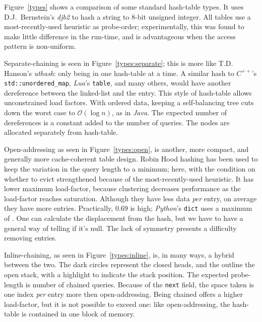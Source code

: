 \documentclass[12pt]{article}
\newcommand{\code}[1]{\colorbox{light-gray}{\texttt{#1}}}
\begin{document}
Figure~\ref{types} shows a comparison of some standard hash-table types. It uses D.J.~Bernstein's {\it djb2} to hash a string to 8-bit unsigned integer. All tables use a most-recently-used heuristic as probe-order; experimentally, this was found to make little difference in the run-time, and is advantageous when the access pattern is non-uniform\cite{brent1973reducing, sleator1985self}.

Separate-chaining is seen in Figure~\ref{types:separate}; this is more like T.D. Hanson's {\it uthash}: only being in one hash-table at a time. A similar hash to {\it $C^{++}$}'s \code{std::unordered\_map}, {\it Lua}'s \code{table}, and many others, would have another dereference between the linked-list and the entry. This style of hash-table allows unconstrained load factors. With ordered data, keeping a self-balancing tree cuts down the worst case to $\mathcal{O}(\log n)$\cite{knuth1998sorting}, as in {\it Java}. The expected number of dereferences is a constant added to the number of queries. The nodes are allocated separately from hash-table.

Open-addressing\cite{peterson1957addressing} as seen in Figure~\ref{types:open}, is another, more compact, and generally more cache-coherent table design. Robin Hood hashing\cite{celis1985robin} has been used to keep the variation in the query length to a minimum; here, with the condition on whether to evict strengthened because of the most-recently-used heuristic. It has lower maximum load-factor, because clustering decreases performance as the load-factor reaches saturation.\cite{skiena2008algorithm} Although they have less data {\it per} entry, on average they have more entries. Practically, 0.69 is high; {\it Python}'s \code{dict}\cite{knuth1998sorting} uses a maximum of . One can calculate the displacement from the hash, but we have to have a general way of telling if it's null. The lack of symmetry presents a difficulty removing entries.

Inline-chaining, as seen in Figure~\ref{types:inline}, is, in many ways, a hybrid between the two. The dark circles represent the closed heads, and the outline the open stack, with a highlight to indicate the stack position. The expected probe-length is number of chained queries. Because of the \code{next} field, the space taken is one index {\it per} entry more then open-addressing. Being chained offers a higher load-factor, but it is not possible to exceed one: like open-addressing, the hash-table is contained in one block of memory.
\end{document}
